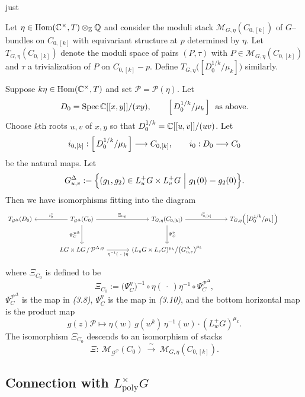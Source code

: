 just \documentclass[12pt]{article}
\begin{document}
Let $\eta\in \operatorname{Hom}(\mathbb{C}^\times,T)\otimes_{\mathbb{Z}}\mathbb{Q}$ and consider the moduli stack
$\mathcal M_{G,\eta}(C_{0,[k]})$ of $G$--bundles on $C_{0,[k]}$ with equivariant
structure at $p$ determined by $\eta$. Let $T_{G,\eta}(C_{0,[k]})$ denote the
moduli space of pairs $(P,\tau)$ with $P\in \mathcal M_{G,\eta}(C_{0,[k]})$ and
$\tau$ a trivialization of $P$ on $C_{0,[k]}-p$. Define
$T_{G,\eta}\bigl([D_0^{1/k}/\mu_k]\bigr)$ similarly.

\begin{proposition}
\label{prop:solis-345}
Suppose $k\eta\in \operatorname{Hom}(\mathbb{C}^\times,T)$ and set $\mathcal P=\mathcal P(\eta)$.
Let
\[
D_0=\operatorname{Spec}\mathbb{C}[[x,y]]/(xy),
\qquad
\Bigl[\,D_0^{1/k}/\mu_k\,\Bigr]
\ \ \text{as above.}
\]
Choose $k$th roots $u,v$ of $x,y$ so that $D_0^{1/k}=\mathbb{C}[[u,v]]/(uv)$.
Let
\[
i_{0,[k]}:\Bigl[\,D_0^{1/k}/\mu_k\,\Bigr]\longrightarrow C_{0,[k]},
\qquad
i_0:D_0\longrightarrow C_0
\]
be the natural maps. Let
\[
G^{\Delta}_{u,v}
:=\Bigl\{(g_1,g_2)\in L_u^+G\times L_v^+G \ \Big|\ g_1(0)=g_2(0)\Bigr\}.
\]
Then we have isomorphisms fitting into the diagram
\[
\begin{tikzcd}[column sep=large,row sep=large]
T_{\mathcal G^{\Delta}}(D_0)
&
T_{\mathcal G^{\Delta}}(C_0)
\arrow[l,"i_0^{*}"']
\arrow[r,"\Xi_{C_0}"]
\arrow[d,"\Psi^{\mathcal P^\Delta}_{C}"']
&
T_{G,\eta}(C_{0,[k]})
\arrow[r,"i_{0,[k]}^{*}"]
\arrow[d,"\Psi^{\eta}_{C}"]
&
T_{G,\eta}\Bigl(\bigl[D_0^{1/k}/\mu_k\bigr]\Bigr)
\\
{} %
&
LG\times LG\,/\,\mathcal P^{\Delta,\eta}
\arrow[r,"\eta^{-1}(\ \cdot\ )\eta"']
&
(L_uG\times L_vG)^{\mu_k}\big/\bigl(G^\Delta_{u,v}\bigr)^{\mu_k}
&
{}  %
&
\end{tikzcd}
\]

where $\Xi_{C_0}$ is defined to be
\[
\Xi_{C_0}
:=\bigl(\Psi^{\eta}_{C}\bigr)^{-1}\circ \eta(\ \cdot\ )\eta^{-1}\circ
\Psi^{\mathcal P^\Delta}_{C},
\]
$\Psi^{\mathcal P^\Delta}_{C}$ is the map in \emph{(3.8)}, $\Psi^{\eta}_{C}$ is
the map in \emph{(3.10)}, and the bottom horizontal map is the product map
\[
g(z)\mathcal P
\longmapsto
\eta(w)\,g(w^{k})\,\eta^{-1}(w)\cdot (L_w^+G)^{\mu_k}.
\]
The isomorphism $\Xi_{C_0}$ descends to an isomorphism of stacks
\[
\Xi:\ \mathcal M_{\mathcal G^{\mathcal P}}(C_0)\ \xrightarrow{\ \sim\ }\ 
\mathcal M_{G,\eta}(C_{0,[k]}).
\]
\end{proposition}

\subsection*{Connection with $L^{\times}_{\mathrm{poly}}G$}
\end{document}
